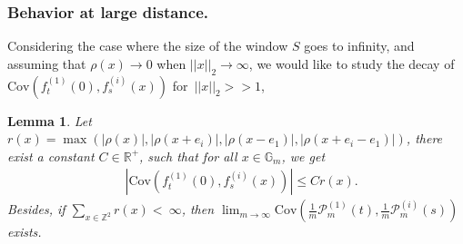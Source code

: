 \documentclass[12pt]{article}
\theoremstyle{Theorem}
\newtheorem{Lemma}[Theorem]{Lemma}
\begin{document}
\subsubsection{Behavior at large distance.}
Considering the case where the size of the window $S$ goes to infinity, and assuming that $\rho(x) \to 0$ when $||x||_{2} \to \infty$, we would like to study the decay of $\text{Cov}\left(f_{t}^{\scriptscriptstyle(1)}(0), f_{s}^{\scriptscriptstyle(i)}(x) \right)$ for~$||x||_{2} >> 1$,  
\begin{Lemma}
Let $r(x) = \max\left(|\rho(x)|, |\rho(x + e_i)|, |\rho(x-e_1)|, |\rho(x +e_i - e_1)| \right)$, there exist a constant $C \in \mathbb{R}^{+}$, such that for all $x \in \mathbb{G}_{m}$, we get
\begin{align*}
&  |\text{Cov}\left(f_{t}^{\scriptscriptstyle(1)}(0), f_{s}^{\scriptscriptstyle(i)}(x) \right)| \leq Cr(x). 
\end{align*}
Besides, if $\sum_{x \in \mathbb{Z}^{2}} r(x) <~\infty$, then 
$\lim_{m \to \infty}\text{Cov}\left(\frac{1}{m}\mathcal{P}_{m}^{\scriptscriptstyle (1)}(t), \frac{1}{m}\mathcal{P}_{m}^{\scriptscriptstyle (i)}(s) \right)$ exists. 
\end{Lemma}
\end{document}
